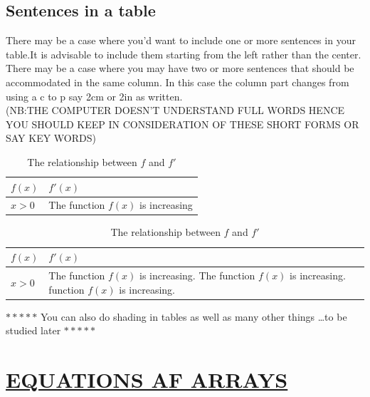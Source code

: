 \documentclass[a4paper,12pt]{article}
\begin{document}
  		 \subsection{Sentences in a table}
  		
  		There may be a case where you'd want to include one or more sentences in your table.It is advisable to include them starting from the left rather than the center.\\
  		There may be a case where you may have two or more sentences that should be accommodated in the same column. In this case the column part changes from using a c to p say 2cm or 2in as written.\\
  		
  		(NB:THE COMPUTER DOESN'T UNDERSTAND FULL WORDS HENCE YOU SHOULD KEEP IN CONSIDERATION OF THESE SHORT FORMS OR SAY KEY WORDS)
  		 \begin{table}
  		 	\centering
  		 	
  		 	\caption{The relationship between $f$ and  $f'$}
  		 	\begin{tabular}{|l|l|}
  		 		\hline
  		 		$f(x)$ & $f'(x)$\\ \hline
  		 		$x>0$ & The function $f(x)$ is increasing\\ \hline
  		 		
  		 		
  		 		\end{tabular}
  		 \end{table}
  		 
  		 
  		\vspace{40pt}
  		
  		  \begin{table}
  		 	\centering
  		 	
  		 	\caption{The relationship between $f$ and  $f'$}
  		 	\begin{tabular}{|l|p{3in}|}
  		 		\hline
  		 		$f(x)$ & $f'(x)$\\ \hline
  		 		$x>0$ & The function $f(x)$ is increasing.
  		 		The function $f(x)$ is increasing. function $f(x)$ is increasing.\\ \hline
  		 		
  		 	\end{tabular}
  		 \end{table}
  		 
  		 
  		$*****$ You can also do shading in tables as well as many other things \ldots to be studied later $*****$
  		 \section{\underline{EQUATIONS AF ARRAYS}}
  		 
\end{document}
